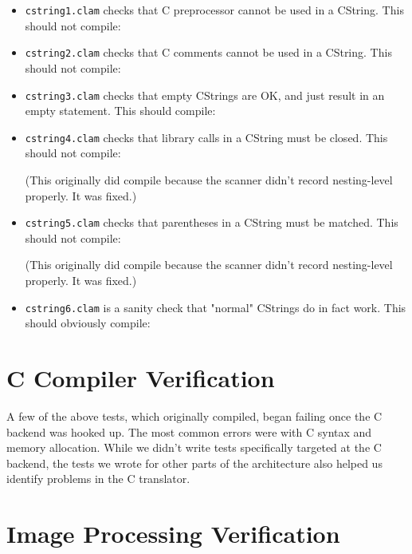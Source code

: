 \begin{itemize}

\item\texttt{cstring1.clam} checks that C preprocessor cannot be used in a CString. This should not compile:


\item\texttt{cstring2.clam} checks that C comments cannot be used in a CString. This should not compile:


\item\texttt{cstring3.clam} checks that empty CStrings are OK, and just result in an empty statement. This should compile:


\item\texttt{cstring4.clam} checks that library calls in a CString must be closed. This should not compile:

(This originally did compile because the scanner didn't record nesting-level properly. It was fixed.)

\item\texttt{cstring5.clam} checks that parentheses in a CString must be matched. This should not compile:

(This originally did compile because the scanner didn't record nesting-level properly. It was fixed.)

\item\texttt{cstring6.clam} is a sanity check that "normal" CStrings do in fact work. This should obviously compile:


\end{itemize}

\section{C Compiler Verification}
\label{test:ccompiler}

A few of the above tests, which originally compiled, began failing once the C backend was hooked up.
The most common errors were with C syntax and memory allocation.
While we didn't write tests specifically targeted at the C backend,
the tests we wrote for other parts of the architecture also helped us identify problems in the C translator. 

\section{Image Processing Verification}
\label{test:output}

